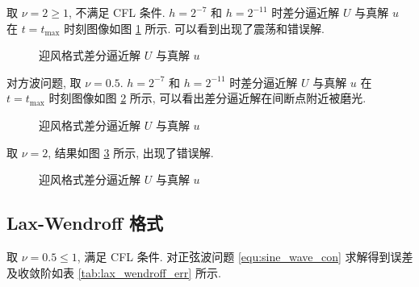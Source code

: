 \documentclass[UTF8, a4paper, 12pt, oneside, onecolumn]{article}
\begin{document}
取 $\nu = 2 \geq 1$, 不满足 CFL 条件. $h = 2^{-7}$ 和 $h = 2^{-11}$ 时差分逼近解 $U$ 与真解 $u$ 在 $t = t_{\max }$ 时刻图像如图 \ref{fig:upwind_Uu_noCFL} 所示. 可以看到出现了震荡和错误解.

\begin{figure}[H]\centering{}
	\resizebox{0.4\linewidth}{!}{}\quad
	\resizebox{0.4\linewidth}{!}{}
	\caption{迎风格式差分逼近解 $U$ 与真解 $u$}\label{fig:upwind_Uu_noCFL}
\end{figure}

对方波问题, 取 $\nu = 0.5$. $h = 2^{-7}$ 和 $h = 2^{-11}$ 时差分逼近解 $U$ 与真解 $u$ 在 $t = t_{\max }$ 时刻图像如图 \ref{fig:upwind_square_Uu} 所示, 可以看出差分逼近解在间断点附近被磨光.

\begin{figure}[H]\centering{}
	\resizebox{0.4\linewidth}{!}{}\quad
	\resizebox{0.4\linewidth}{!}{}
	\caption{迎风格式差分逼近解 $U$ 与真解 $u$}\label{fig:upwind_square_Uu}
\end{figure}

取 $\nu = 2$, 结果如图 \ref{fig:upwind_square_Uu_noCFL} 所示, 出现了错误解.

\begin{figure}[H]\centering{}
	\resizebox{0.4\linewidth}{!}{}\quad
	\resizebox{0.4\linewidth}{!}{}
	\caption{迎风格式差分逼近解 $U$ 与真解 $u$}\label{fig:upwind_square_Uu_noCFL}
\end{figure}

\subsection{Lax-Wendroff 格式}

取 $\nu = 0.5 \leq 1$, 满足 CFL 条件. 对正弦波问题 \eqref{equ:sine_wave_con} 求解得到误差及收敛阶如表 \ref{tab:lax_wendroff_err} 所示.
\end{document}
